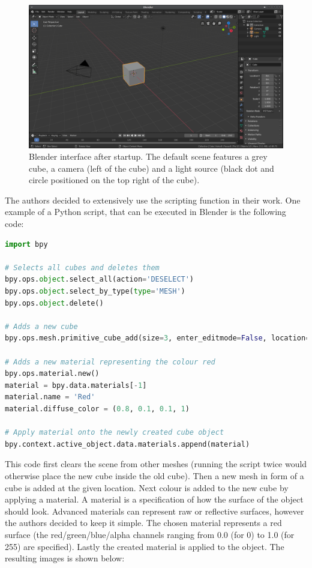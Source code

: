 \begin{figure}[h!]
	\centering
	\includegraphics[width=6.5in]{img/methodology_generatingData_blender_startscreen.png}
	\caption{Blender interface after startup. The default scene features a grey cube, a camera (left of the cube) and a light source (black dot and circle positioned on the top right of the cube).}
	\label{pic:methodology_generatingData_blender_startscreen}
\end{figure}

The authors decided to extensively use the scripting function in their work. One example of a Python script, that can be executed in Blender is the following code:

\newpage

\begin{lstlisting}[language=python]
import bpy

# Selects all cubes and deletes them
bpy.ops.object.select_all(action='DESELECT')
bpy.ops.object.select_by_type(type='MESH')
bpy.ops.object.delete()

# Adds a new cube
bpy.ops.mesh.primitive_cube_add(size=3, enter_editmode=False, location=(4, 2, 0))

# Adds a new material representing the colour red
bpy.ops.material.new()
material = bpy.data.materials[-1]
material.name = 'Red'
material.diffuse_color = (0.8, 0.1, 0.1, 1)

# Apply material onto the newly created cube object
bpy.context.active_object.data.materials.append(material)
\end{lstlisting}

This code first clears the scene from other meshes (running the script twice would otherwise place the new cube inside the old cube). Then a new mesh in form of a cube is added at the given location. Next colour is added to the new cube by applying a material. A material is a specification of how the surface of the object should look. Advanced materials can represent raw or reflective surfaces, however the authors decided to keep it simple. The chosen material represents a red surface (the red/green/blue/alpha channels ranging from 0.0 (for 0) to 1.0 (for 255) are specified). Lastly the created material is applied to the object. The resulting images is shown below:


